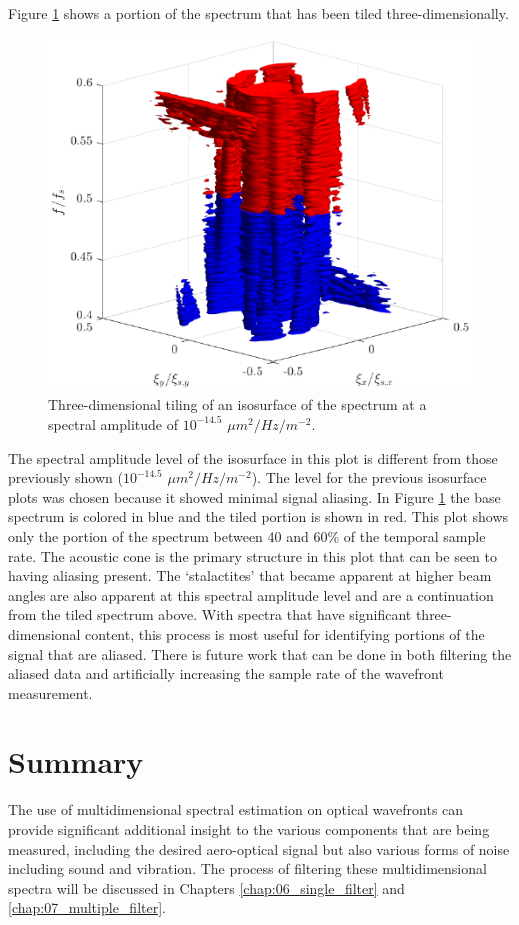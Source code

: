 Figure \ref{fig:04_dispersion_3d_tile} shows a portion of the spectrum that has been tiled three-dimensionally.
\begin{figure}
  \centering
  \includegraphics{../matlab/04_dispersion_analysis/dispersion_3d_tile.eps}
  \caption{Three-dimensional tiling of an isosurface of the spectrum at a spectral amplitude of $10^{-14.5}$ $\mu m^2/Hz/m^{-2}$.}
  \label{fig:04_dispersion_3d_tile}
\end{figure}
The spectral amplitude level of the isosurface in this plot is different from those previously shown ($10^{-14.5}$ $\mu m^2/Hz/m^{-2}$).
The level for the previous isosurface plots was chosen because it showed minimal signal aliasing.
In Figure \ref{fig:04_dispersion_3d_tile} the base spectrum is colored in blue and the tiled portion is shown in red.
This plot shows only the portion of the spectrum between 40 and 60\% of the temporal sample rate.
The acoustic cone is the primary structure in this plot that can be seen to having aliasing present.
The `stalactites' that became apparent at higher beam angles are also apparent at this spectral amplitude level and are a continuation from the tiled spectrum above.
With spectra that have significant three-dimensional content, this process is most useful for identifying portions of the signal that are aliased.
There is future work that can be done in both filtering the aliased data and artificially increasing the sample rate of the wavefront measurement.

\section{Summary}
The use of multidimensional spectral estimation on optical wavefronts can provide significant additional insight to the various components that are being measured, including the desired aero-optical signal but also various forms of noise including sound and vibration.
The process of filtering these multidimensional spectra will be discussed in Chapters \ref{chap:06_single_filter} and \ref{chap:07_multiple_filter}.
